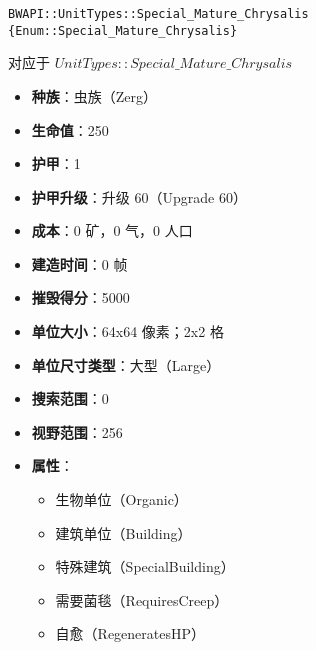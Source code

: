 \begin{tcolorbox}[colback=white, colframe=black!60!white, title=Special\_Mature\_Chrysalis(), arc=0mm]
    \begin{verbatim}
BWAPI::UnitTypes::Special_Mature_Chrysalis {Enum::Special_Mature_Chrysalis}
    \end{verbatim}
    对应于  $UnitTypes::Special\_Mature\_Chrysalis$ 
    \begin{itemize}
        \item \textbf{种族}：虫族（Zerg）
        \item \textbf{生命值}：250
        \item \textbf{护甲}：1
        \item \textbf{护甲升级}：升级 60（Upgrade 60）
        \item \textbf{成本}：0 矿，0 气，0 人口
        \item \textbf{建造时间}：0 帧
        \item \textbf{摧毁得分}：5000
        \item \textbf{单位大小}：64x64 像素；2x2 格
        \item \textbf{单位尺寸类型}：大型（Large）
        \item \textbf{搜索范围}：0
        \item \textbf{视野范围}：256
        \item \textbf{属性}：
            \begin{itemize}
                \item 生物单位（Organic）
                \item 建筑单位（Building）
                \item 特殊建筑（SpecialBuilding）
                \item 需要菌毯（RequiresCreep）
                \item 自愈（RegeneratesHP）
            \end{itemize}
    \end{itemize}
\end{tcolorbox}

